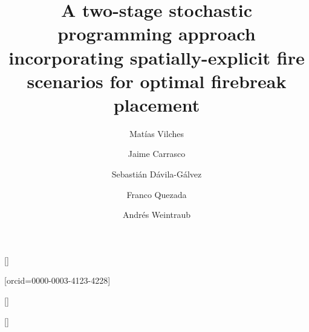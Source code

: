 \documentclass[a4paper,fleqn]{cas-sc}
\begin{document}
\let\WriteBookmarks\relax
\def\floatpagepagefraction{1}
\def\textpagefraction{.001}

\title [mode = title]{A two-stage stochastic programming approach incorporating spatially-explicit fire scenarios for optimal firebreak placement} 

\author[2]{Mat\'ias Vilches}[]

\author[1,5]{Jaime Carrasco}[orcid=0000-0003-4123-4228]


\author[2,4]{Sebasti\'an D\'avila-G\'alvez}\cormark[1]




\author[2,4]{Franco Quezada}[]


\author[3,5]{Andr\'es Weintraub}[]


\address[1]{Departamento de Industria, Facultad de Ingenier\'ia, Universidad Tecnol\'ogica Metropolitana, Santiago, Chile}

\address[2]{Industrial Engineering Department, Faculty of Engineering, University of Santiago of Chile, Santiago, Chile}

\address[3]{Industrial Engineering Department, University of Chile, Santiago, Chile}

\address[4]{Program for the Development of Sustainable Production Systems, Faculty of Engineering, University of Santiago of Chile, Santiago, Chile}

\address[5]{Complex Engineering System Institute - ISCI, Santiago, Chile}

\end{document}
